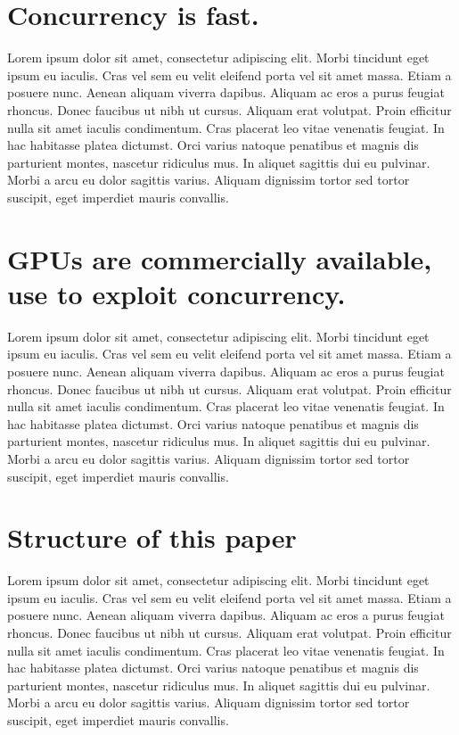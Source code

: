 \documentclass[openany]{book}
\begin{document}
\section{Concurrency is fast.}
Lorem ipsum dolor sit amet, consectetur adipiscing elit. Morbi tincidunt eget 
ipsum eu iaculis. Cras vel sem eu velit eleifend porta vel sit amet massa. Etiam 
a posuere nunc. Aenean aliquam viverra dapibus. Aliquam ac eros a purus feugiat 
rhoncus. Donec faucibus ut nibh ut cursus. Aliquam erat volutpat. Proin efficitur 
nulla sit amet iaculis condimentum. Cras placerat leo vitae venenatis feugiat. In 
hac habitasse platea dictumst. Orci varius natoque penatibus et magnis dis 
parturient montes, nascetur ridiculus mus. In aliquet sagittis dui eu pulvinar. 
Morbi a arcu eu dolor sagittis varius. Aliquam dignissim tortor sed tortor 
suscipit, eget imperdiet mauris convallis.~\cite[p.~00]{SourceNeeded}



\section{GPUs are commercially available, use to exploit concurrency.}
Lorem ipsum dolor sit amet, consectetur adipiscing elit. Morbi tincidunt eget 
ipsum eu iaculis. Cras vel sem eu velit eleifend porta vel sit amet massa. Etiam 
a posuere nunc. Aenean aliquam viverra dapibus. Aliquam ac eros a purus feugiat 
rhoncus. Donec faucibus ut nibh ut cursus. Aliquam erat volutpat. Proin efficitur 
nulla sit amet iaculis condimentum. Cras placerat leo vitae venenatis feugiat. In 
hac habitasse platea dictumst. Orci varius natoque penatibus et magnis dis 
parturient montes, nascetur ridiculus mus. In aliquet sagittis dui eu pulvinar. 
Morbi a arcu eu dolor sagittis varius. Aliquam dignissim tortor sed tortor 
suscipit, eget imperdiet mauris convallis.~\cite[p.~00]{SourceNeeded}



\section{Structure of this paper}
Lorem ipsum dolor sit amet, consectetur adipiscing elit. Morbi tincidunt eget 
ipsum eu iaculis. Cras vel sem eu velit eleifend porta vel sit amet massa. Etiam 
a posuere nunc. Aenean aliquam viverra dapibus. Aliquam ac eros a purus feugiat 
rhoncus. Donec faucibus ut nibh ut cursus. Aliquam erat volutpat. Proin efficitur 
nulla sit amet iaculis condimentum. Cras placerat leo vitae venenatis feugiat. In 
hac habitasse platea dictumst. Orci varius natoque penatibus et magnis dis 
parturient montes, nascetur ridiculus mus. In aliquet sagittis dui eu pulvinar. 
Morbi a arcu eu dolor sagittis varius. Aliquam dignissim tortor sed tortor 
suscipit, eget imperdiet mauris convallis.
\end{document}
